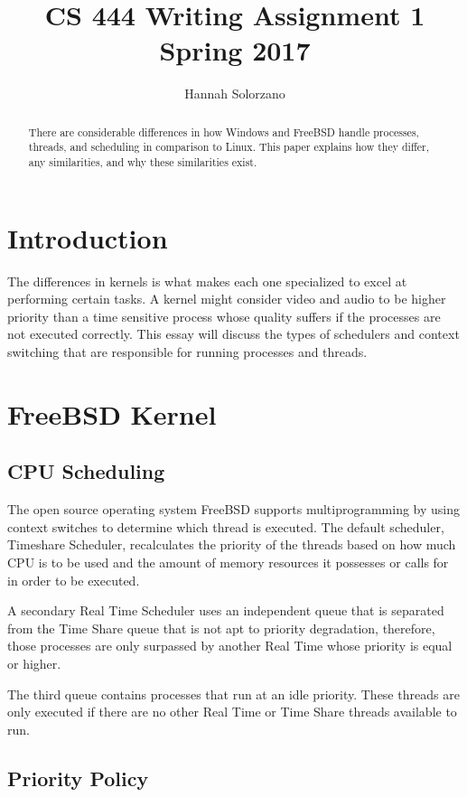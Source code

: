 \documentclass[10pt, draftclsnofoot,onecolumn]{IEEEtran}
\title{CS 444 Writing Assignment 1 \\ {\large Spring 2017}}
\author{Hannah Solorzano}
\begin{document}
\maketitle

\vfill
\begin{abstract}
There are considerable differences in how Windows and FreeBSD handle processes,
threads, and scheduling in comparison to Linux. This paper explains how they differ,
any similarities, and why these similarities exist.
\end{abstract}
\newpage

\section{Introduction}

The differences in kernels is what makes each one specialized to excel at
performing certain tasks. A kernel might consider video and audio to be higher
priority than a time sensitive process whose quality suffers if the processes are
not executed correctly. This essay will discuss the types of schedulers and
context switching that are responsible for running processes and threads.

\section{FreeBSD Kernel}

\subsection{CPU Scheduling}

The open source operating system FreeBSD supports multiprogramming by using
context switches to determine which thread is executed. The default scheduler,
Timeshare Scheduler, recalculates the priority of the threads based on how much
CPU is to be used and the amount of memory resources it possesses or calls for
in order to be executed.\par
A secondary Real Time Scheduler uses an independent queue that is separated from
the Time Share queue that is not apt to priority degradation, therefore, those
processes are only surpassed by another Real Time whose priority is equal or
higher.\par
The third queue contains processes that run at an idle priority. These threads
are only executed if there are no other Real Time or Time Share threads available
to run.

\subsection{Priority Policy}
\end{document}
